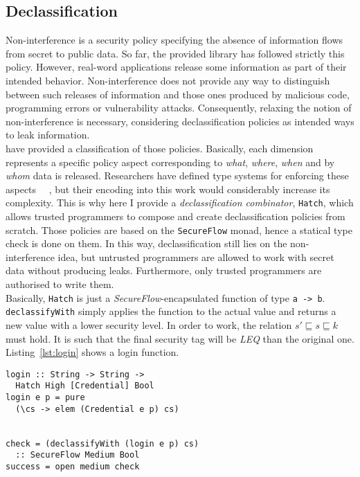 \subsection{Declassification}
Non-interference is a security policy specifying the absence of information flows from secret to public data. So far, the provided library has followed strictly this policy. However, real-word applications release some information as part of their intended behavior. Non-interference does not provide any way to distinguish between such releases of information and those ones produced by malicious code, programming errors or vulnerability attacks. Consequently, relaxing the notion of non-interference is necessary, considering declassification policies as intended ways to leak information. \\
\citeauthor{sabelfeld2005dimensions} \cite{sabelfeld2005dimensions} have provided a classification of those policies. Basically, each dimension represents a specific policy aspect corresponding to \textit{what}, \textit{where}, \textit{when} and by \textit{whom} data is released. Researchers have defined type systems for enforcing these aspects \cite{banerjee2008expressive}~\cite{zdancewic2001robust}~\cite{zdancewic2003type}, but their encoding into this work would considerably increase its complexity. This is why here I provide a \textit{declassification combinator}, \texttt{Hatch}, which allows trusted programmers to compose and create declassification policies from scratch. Those policies are based on the \texttt{SecureFlow} monad, hence a statical type check is done on them. In this way, declassification still lies on the non-interference idea, but untrusted programmers are allowed to work with secret data without producing leaks. Furthermore, only trusted programmers are authorised to write them. \\
Basically, \texttt{Hatch} is just a \textit{SecureFlow}-encapsulated function of type \texttt{a -> b}. \texttt{declassifyWith} simply applies the function to the actual value and returns a new value with a lower security level. In order to work, the relation $s' \sqsubseteq s \sqsubseteq k$ must hold. It is such that the final security tag will be \textit{LEQ} than the original one. \\
Listing~\ref{lst:login} shows a login function.
\begin{lstlisting}[caption={Declassificated login}, label={lst:login}]
login :: String -> String -> 
  Hatch High [Credential] Bool
login e p = pure
  (\cs -> elem (Credential e p) cs)


check = (declassifyWith (login e p) cs)
  :: SecureFlow Medium Bool
success = open medium check
\end{lstlisting}
